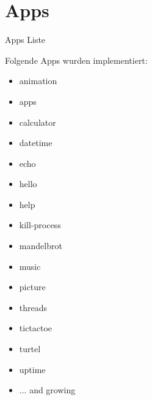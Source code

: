 \section{Apps}



\begin{frame}{Apps Liste}
    \begin{Large}
        Folgende Apps wurden implementiert:
    \end{Large}
    \vspace{15pt}

    \begin{minipage}[t]{0.4\textwidth}
        \begin{itemize}
            \item animation
            \item apps
            \item calculator
            \item datetime
            \item echo
            \item hello
            \item help
            \item kill-process
        \end{itemize}
        
           
    \end{minipage}
    \hfill
    \begin{minipage}[t]{0.4\textwidth}
        \begin{itemize} 
            \item mandelbrot
            \item music
            \item picture
            \item threads
            \item tictactoe
            \item turtel
            \item uptime
            \item ... and growing
        \end{itemize} 
    \end{minipage}


    
    
\end{frame}


